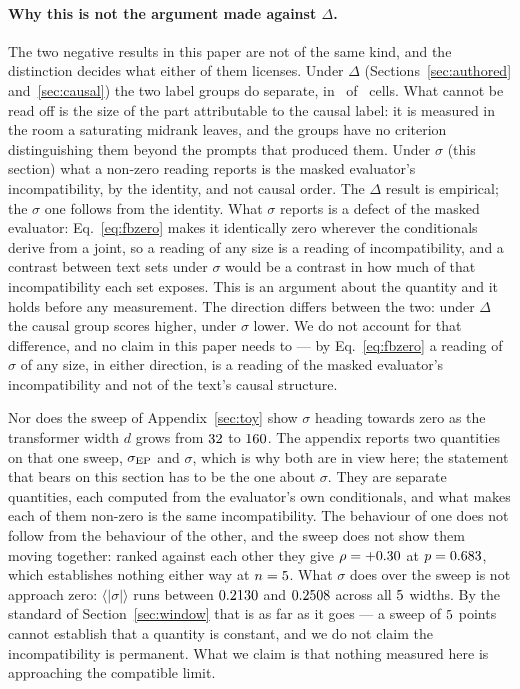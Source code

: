 \paragraph{Why this is not the argument made against $\Delta$.}
The two negative results in this paper are not of the same kind, and the
distinction decides what either of them licenses.  Under $\Delta$
(Sections~\ref{sec:authored} and~\ref{sec:causal}) the two label groups do
separate, in \ContrastNRejecting\ of \ContrastNCells\ cells.  What cannot be
read off is the size of the part attributable to the causal label: it is
measured in the room a saturating midrank leaves, and the groups have no
criterion distinguishing them
beyond the prompts that produced them.  Under $\sigma$
(this section) what a non-zero reading reports is the masked evaluator's
incompatibility, by the identity, and not causal order.  The $\Delta$
result is empirical; the $\sigma$ one follows from the identity.  What $\sigma$ reports is
a defect of the masked evaluator: Eq.~\eqref{eq:fbzero} makes it identically zero
wherever the conditionals derive from a joint, so a reading of any size is
a reading of incompatibility, and a contrast between text sets under
$\sigma$ would be a contrast in how much of that incompatibility each set
exposes.  This is an argument about the quantity and it holds before any
measurement.  The direction differs between the two: under $\Delta$ the
causal group scores higher, under $\sigma$ lower.  We do not account for
that difference, and no claim in this paper needs to --- by Eq.~\eqref{eq:fbzero} a
reading of $\sigma$ of any size, in either direction, is a reading of the
masked evaluator's incompatibility and not of the text's causal structure.

Nor does the sweep of Appendix~\ref{sec:toy} show $\sigma$ heading towards
zero as the transformer width $d$ grows from $32$ to $160$.
The appendix reports two quantities on that one sweep, $\sigma_{\mathrm{EP}}$ and
$\sigma$, which is why both are in view here; the statement that bears on
this section has to be the one about $\sigma$.  They are separate
quantities, each computed from the evaluator's own conditionals, and what
makes each of them non-zero is the same incompatibility.  The behaviour of
one does not follow from the behaviour of the other, and the sweep does not
show them moving together: ranked against each other they give
$\rho = +0.30$ at $p = 0.683$, which establishes nothing either way
at $n = 5$.  What $\sigma$ does over the sweep is
not approach zero: $\langle|\sigma|\rangle$ runs between $0.2130$
and $0.2508$ across all $5$ widths.  By the
standard of Section~\ref{sec:window} that is as far as it goes --- a sweep
of $5$ points cannot establish that a quantity is constant, and
we do not claim the incompatibility is permanent.  What we claim is that
nothing measured here is approaching the compatible limit.

